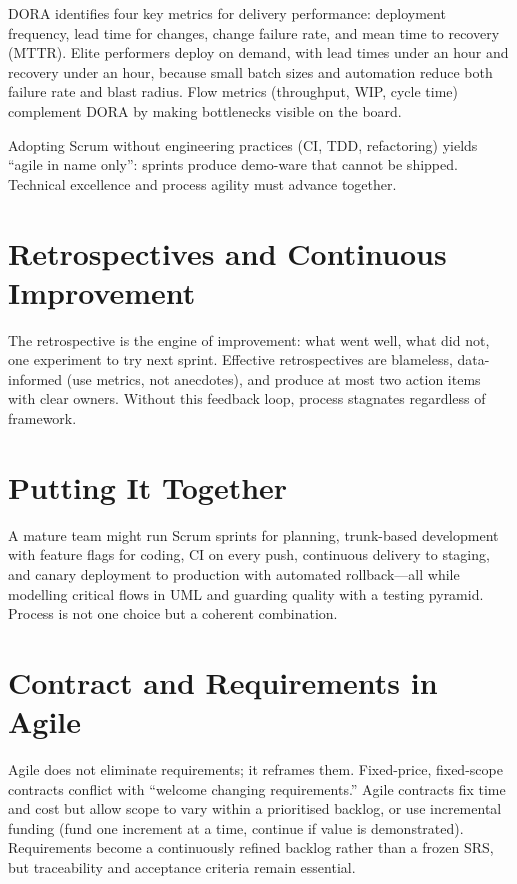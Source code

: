 DORA identifies four key metrics for delivery performance: deployment frequency, lead time for changes, change failure rate, and mean time to recovery (MTTR). Elite performers deploy on demand, with lead times under an hour and recovery under an hour, because small batch sizes and automation reduce both failure rate and blast radius. Flow metrics (throughput, WIP, cycle time) complement DORA by making bottlenecks visible on the board.

\begin{remark}
Adopting Scrum without engineering practices (CI, TDD, refactoring) yields ``agile in name only'': sprints produce demo-ware that cannot be shipped. Technical excellence and process agility must advance together.
\end{remark}

\section{Retrospectives and Continuous Improvement}

The retrospective is the engine of improvement: what went well, what did not, one experiment to try next sprint. Effective retrospectives are blameless, data-informed (use metrics, not anecdotes), and produce at most two action items with clear owners. Without this feedback loop, process stagnates regardless of framework.

\section{Putting It Together}

A mature team might run Scrum sprints for planning, trunk-based development with feature flags for coding, CI on every push, continuous delivery to staging, and canary deployment to production with automated rollback---all while modelling critical flows in UML and guarding quality with a testing pyramid. Process is not one choice but a coherent combination.


\section{Contract and Requirements in Agile}

Agile does not eliminate requirements; it reframes them. Fixed-price, fixed-scope contracts conflict with ``welcome changing requirements.'' Agile contracts fix time and cost but allow scope to vary within a prioritised backlog, or use incremental funding (fund one increment at a time, continue if value is demonstrated). Requirements become a continuously refined backlog rather than a frozen SRS, but traceability and acceptance criteria remain essential.


